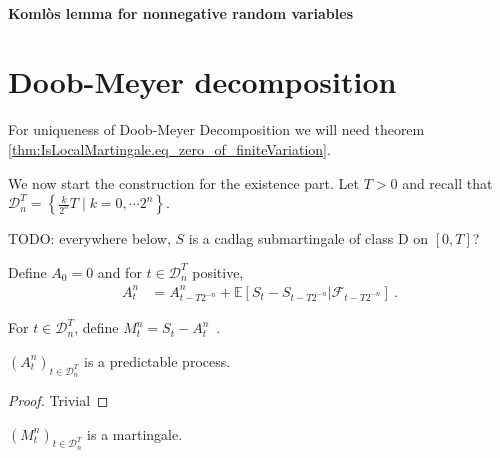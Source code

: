 \paragraph{Komlòs lemma for nonnegative random variables}





\section{Doob-Meyer decomposition}



For uniqueness of Doob-Meyer Decomposition we will need theorem \ref{thm:IsLocalMartingale.eq_zero_of_finiteVariation}.

We now start the construction for the existence part.
Let $T>0$ and recall that $\mathcal{D}_n^T=\left\lbrace \frac{k}{2^n}T \mid k=0,\cdots 2^n\right\rbrace$.

TODO: everywhere below, $S$ is a cadlag submartingale of class D on $[0,T]$?


\begin{definition}[A]\label{def:A}
Define $A_0=0$ and for $t\in\mathcal{D}_n^T$ positive,
\begin{align*}
A^n_t
&=A^n_{t-T2^{-n}} + \mathbb{E}\left[ S_t-S_{t-T2^{-n}}|\mathcal{F}_{t-T2^{-n}}\right]
\: .
\end{align*}
\end{definition}


\begin{definition}[M]\label{def:M}
For $t\in\mathcal{D}_n^T$, define $M^n_t = S_t-A^n_t$~.
\end{definition}


\begin{lemma}\label{lem:Doob_Meyer_Finite_Predictable}
  $(A^n_t)_{t\in\mathcal{D}_n^T}$ is a predictable process.
\end{lemma}

\begin{proof}
  Trivial
\end{proof}


\begin{lemma}\label{lem:Doob_Meyer_Finite_Martingale}
  $(M^n_t)_{t\in\mathcal{D}_n^T}$ is a martingale.
\end{lemma}

